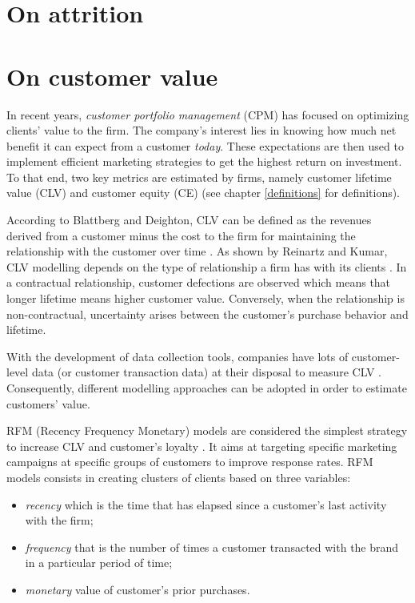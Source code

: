 \documentclass[
]{book}
\providecommand{\tightlist}{%
  \setlength{\itemsep}{0pt}\setlength{\parskip}{0pt}}
\begin{document}
\hypertarget{attrition}{%
\section{On attrition}\label{attrition}}

\hypertarget{value}{%
\section{On customer value}\label{value}}

In recent years, \emph{customer portfolio management} (CPM) has focused on optimizing clients' value to the firm. The company's interest lies in knowing how much net benefit it can expect from a customer \emph{today}. These expectations are then used to implement efficient marketing strategies to get the highest return on investment. To that end, two key metrics are estimated by firms, namely customer lifetime value (CLV) and customer equity (CE) (see chapter \ref{definitions} for definitions).

According to Blattberg and Deighton, CLV can be defined as the revenues derived from a customer minus the cost to the firm for maintaining the relationship with the customer over time \citep{CLV_DEF}. As shown by Reinartz and Kumar, CLV modelling depends on the type of relationship a firm has with its clients \citep{CLV_CONTEXT}. In a contractual relationship, customer defections are observed which means that longer lifetime means higher customer value. Conversely, when the relationship is non-contractual, uncertainty arises between the customer's purchase behavior and lifetime.

With the development of data collection tools, companies have lots of customer-level data (or customer transaction data) at their disposal to measure CLV \citep{CLV_NBD}. Consequently, different modelling approaches can be adopted in order to estimate customers' value.

RFM (Recency Frequency Monetary) models are considered the simplest strategy to increase CLV and customer's loyalty \citep{CLV}. It aims at targeting specific marketing campaigns at specific groups of customers to improve response rates. RFM models consists in creating clusters of clients based on three variables:

\begin{itemize}
\tightlist
\item
  \emph{recency} which is the time that has elapsed since a customer's last activity with the firm;
\item
  \emph{frequency} that is the number of times a customer transacted with the brand in a particular period of time;
\item
  \emph{monetary} value of customer's prior purchases.
\end{itemize}
\end{document}

